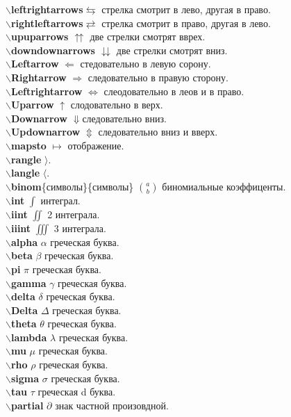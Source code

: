 \documentclass{article}
\newcommand{\bs}{$\backslash$}
\newcommand{\bd}[1]{{\bfseries #1}} %
\newcommand{\bb}[1]{\bd{\bs #1}} %
\begin{document}
\bb{leftrightarrows}$\leftrightarrows$ стрелка смотрит в лево, другая в право.\\
\bb{rightleftarrows}$\rightleftarrows$ стрелка смотрит в право, другая в лево.\\
\bb{upuparrows} $\upuparrows$ две стрелки смотрят вврех.\\
\bb{downdownarrows} $\downdownarrows$ две стрелки смотрят вниз.\\
\bb{Leftarrow} $\Leftarrow$ стедовательно в левую сорону.\\
\bb{Rightarrow} $\Rightarrow$ следовательно в правую сторону.\\
\bb{Leftrightarrow} $\Leftrightarrow$ слеодовательно в леов и в право.\\
\bb{Uparrow} $\uparrow$ слодовательно в верх.\\
\bb{Downarrow} $\Downarrow$следовательно вниз.\\
\bb{Updownarrow} $\Updownarrow$ следовательно вниз и вверх.\\
\bb{mapsto} $\mapsto$ отображение.\\
\bb{rangle} $\rangle$.\\
\bb{langle} $\langle$.\\
\bb{binom}\{символы\}\{символы\} $\binom{a}{b}$ биномиальные коэффиценты.\\
\bb{int} $\int$ интеграл.\\
\bb{iint} $\iint$ 2 интеграла.\\
\bb{iiint} $\iiint$ 3 интеграла.\\
\bb{alpha} $\alpha$ греческая буква.\\
\bb{beta} $\beta$ греческая буква.\\
\bb{pi} $\pi$ греческая буква.\\
\bb{gamma} $\gamma$ греческая буква.\\
\bb{delta} $\delta$ греческая буква.\\
\bb{Delta} $\Delta$ греческая буква.\\
\bb{theta} $\theta$ греческая буква.\\
\bb{lambda} $\lambda$ греческая буква.\\
\bb{mu} $\mu$ греческая буква.\\
\bb{rho} $\rho$ греческая буква.\\
\bb{sigma} $\sigma$ греческая буква.\\
\bb{tau} $\tau$ греческая d
буква.\\
\bb{partial} $\partial$ знак частной произовдной.\\
\end{document}
